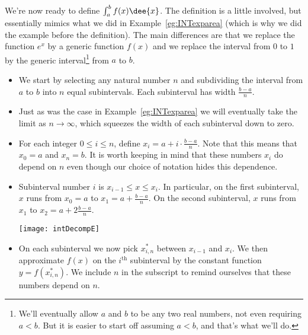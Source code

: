 We're now ready to define $\int_a^b f(x)\dee{x}$. The definition is a little involved,
but essentially mimics what we did in Example~\ref{eg:INTexparea} (which is why we did
the example before the definition). The main differences are that we replace the function
$e^x$ by a generic function $f(x)$ and we replace the interval from $0$ to $1$ by the
generic interval\footnote{We'll eventually allow $a$ and $b$ to be any two real numbers,
not even requiring $a<b$. But it is easier to start off assuming $a<b$, and that's what
we'll do.} from $a$ to $b$.
\begin{itemize}
\item We start by selecting any natural number $n$ and subdividing the interval from
$a$ to $b$ into $n$ equal subintervals. Each subinterval has width $\frac{b-a}{n}$.

\item Just as was the case in Example~\ref{eg:INTexparea} we will eventually take the
limit as $n\to\infty$, which squeezes the width of each subinterval down to zero.

\item For each integer $0\le i\le n$, define $x_i = a + i \cdot\frac{b-a}{n}$. Note that
this means that $x_0=a$ and $x_n = b$. It is worth keeping in mind that these numbers
$x_i$ do depend on $n$ even though our choice of notation hides this dependence.

\item Subinterval number $i$ is $x_{i-1} \leq x \leq
x_i$. In particular, on the first subinterval, $x$ runs from $x_0=a$
to $x_1=a+\frac{b-a}{n}$. On the second subinterval, $x$ runs from $x_1$ to
$x_2=a+2\frac{b-a}{n}$.
     \begin{efig}
     \begin{center}
         \texttt{[image: intDecompE]}
     \end{center}
     \end{efig}

\item On each subinterval we now pick $x_{i,n}^*$ between $x_{i-1}$ and $x_i$. We then
approximate $f(x)$ on the $i^\mathrm{th}$ subinterval by the constant function
$y=f(x_{i,n}^*)$. We include $n$ in the subscript to remind ourselves that these numbers
depend on $n$.


\end{itemize}
